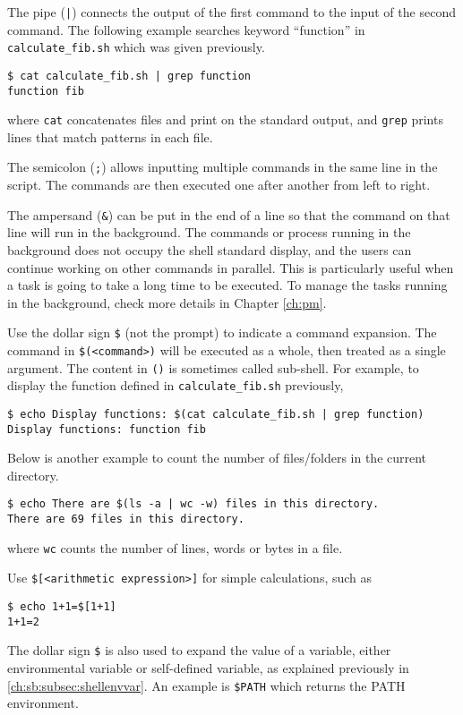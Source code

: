 {The pipe (\verb$|$) connects the output of the first command to the input of the second command. The following example searches keyword ``function'' in \verb|calculate_fib.sh| which was given previously.
\begin{lstlisting}
$ cat calculate_fib.sh | grep function
function fib
\end{lstlisting}
where \verb|cat| concatenates files and print on the standard output, and \verb|grep| prints lines that match patterns in each file.

The semicolon (\verb|;|) allows inputting multiple commands in the same line in the script. The commands are then executed one after another from left to right.

The ampersand (\verb|&|) can be put in the end of a line so that the command on that line will run in the background. The commands or process running in the background does not occupy the shell standard display, and the users can continue working on other commands in parallel. This is particularly useful when a task is going to take a long time to be executed. To manage the tasks running in the background, check more details in Chapter \ref{ch:pm}.

Use the dollar sign \verb|$| (not the prompt) to indicate a command expansion. The command in \verb|$(<command>)| will be executed as a whole, then treated as a single argument. The content in \verb|()| is sometimes called sub-shell. For example, to display the function defined in \verb|calculate_fib.sh| previously,
\begin{lstlisting}
$ echo Display functions: $(cat calculate_fib.sh | grep function)
Display functions: function fib
\end{lstlisting}
Below is another example to count the number of files/folders in the current directory.
\begin{lstlisting}
$ echo There are $(ls -a | wc -w) files in this directory.
There are 69 files in this directory.
\end{lstlisting}
where \verb|wc| counts the number of lines, words or bytes in a file.

Use \verb|$[<arithmetic expression>]| for simple calculations, such as
\begin{lstlisting}
$ echo 1+1=$[1+1]
1+1=2
\end{lstlisting}

The dollar sign \verb|$| is also used to expand the value of a variable, either environmental variable or self-defined variable, as explained previously in \ref{ch:sb:subsec:shellenvvar}. An example is \verb|$PATH| which returns the PATH environment.

}
